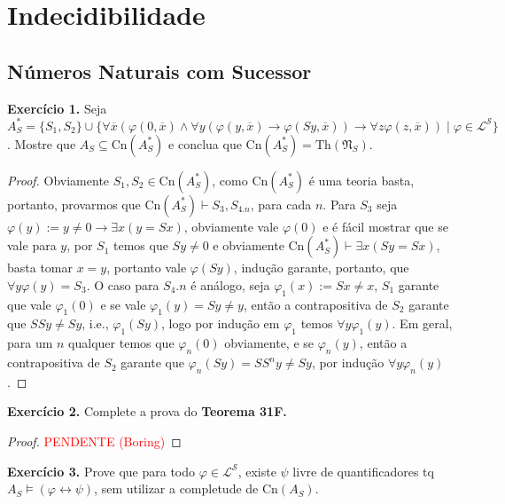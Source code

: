 \documentclass[11pt]{article}
\newcommand{\mc}[1]{\mathcal{#1}}
\newcommand{\mf}[1]{\mathfrak{#1}}
\newcommand{\subs}[2]{
    \setcounter{subsection}{#1 - 1}
    \subsection{#2}
    }
\newcommand{\rp}[1]{{\left(#1\right)}}
\begin{document}
\section{Indecidibilidade}

\subs{1}{Números Naturais com Sucessor}

\begin{shaded}
\textbf{Exercício 1.} Seja $A^*_S=\{S_1,S_2\}\cup\{\forall\overline{x}\rp{\varphi(0,\overline{x})\wedge\forall y(\varphi(y,\overline{x})\to\varphi(Sy,\overline{x}))\to\forall z\varphi(z,\overline{x})}\mid\varphi\in\mc{L}^\mc{S}\}$. Mostre que $A_S\subseteq\text{Cn}(A^*_S)$ e conclua que $\text{Cn}(A^*_S)=\text{Th}(\mf{N}_S)$.
\end{shaded}

\begin{proof}
    Obviamente $S_1,S_2\in\text{Cn}(A^*_S)$, como $\text{Cn}(A^*_S)$ é uma teoria basta, portanto, provarmos que $\text{Cn}(A^*_S)\vdash S_3, S_{4.n}$, para cada $n$. Para $S_3$ seja $\varphi(y):=y\neq 0\to\exists x(y=Sx)$, obviamente vale $\varphi(0)$ e é fácil mostrar que se vale para $y$, por $S_1$ temos que $Sy\neq0$ e obviamente $\text{Cn}(A^*_S)\vdash\exists x(Sy=Sx)$, basta tomar $x=y$, portanto vale $\varphi(Sy)$, indução garante, portanto, que $\forall y\varphi(y)=S_3$. O caso para $S_4.n$ é análogo, seja $\varphi_1(x):=Sx\neq x$, $S_1$ garante que vale $\varphi_1(0)$ e se vale $\varphi_1(y)=Sy\neq y$, então a contrapositiva de $S_2$ garante que $SSy\neq Sy$, i.e., $\varphi_1(Sy)$, logo por indução em $\varphi_1$ temos $\forall y\varphi_1(y)$. Em geral, para um $n$ qualquer temos que $\varphi_n(0)$ obviamente, e se $\varphi_n(y)$, então a contrapositiva de $S_2$ garante que $\varphi_n(Sy)=SS^ny\neq Sy$, por indução $\forall y\varphi_n(y)$.
\end{proof}

\begin{shaded}
\textbf{Exercício 2.} Complete a prova do \textbf{Teorema 31F.}
\end{shaded}

\begin{proof}
    \textcolor{red}{PENDENTE (Boring)}
\end{proof}

\begin{shaded}
\textbf{Exercício 3.} Prove que para todo $\varphi\in\mc{L}^\mc{S}$, existe $\psi$ livre de quantificadores tq $A_S\vDash(\varphi\leftrightarrow\psi)$, sem utilizar a completude de $\text{Cn}(A_S)$.
\end{shaded}
\end{document}

